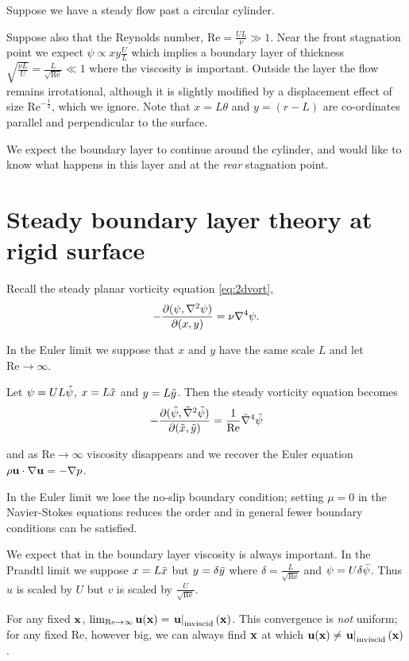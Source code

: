 \documentclass{notes}
\newcommand{\Rey}{\mathrm{Re}}
\theoremstyle{plain}
\begin{document}
Suppose we have a steady flow past a circular cylinder.

\vspace{1in}

Suppose also that the Reynolds number, $\Rey = \frac{U L}{\nu} \gg 1$.
Near the front stagnation point we expect $\psi \propto x y \frac{U}{L}$
which implies a boundary layer of thickness $\sqrt{\frac{\nu L}{U}}
= \frac{L}{\sqrt{\Rey}} \ll 1$ where the viscosity is important.  Outside
the layer the flow remains irrotational, although it is slightly
modified by a displacement effect of size $\Rey^{-\frac{1}{2}}$, which
we ignore.  Note that $x = L \theta$ and $y = (r - L)$ are co-ordinates 
parallel and perpendicular to the surface.

We expect the boundary layer to continue around the cylinder, and
would like to know what happens in this layer and at the \emph{rear}
stagnation point.

\section[Steady boundary layers]{Steady boundary layer theory at rigid surface}

Recall the steady planar vorticity equation \eqref{eq:2dvort},
\[
- \frac{\partial (\psi,\nabla^2 \psi)}{\partial (x,y)} = \nu \nabla^4 \psi.
\]

In the Euler limit we suppose that $x$ and $y$ have the same scale $L$
and let $\Rey \to \infty$.

Let $\psi = U L \Tilde{\psi}$, $x = L \Tilde{x}$ and $y = L \Tilde{y}$.
Then the steady vorticity equation becomes
\[
- \pd{(\Tilde{\psi},\Tilde{\nabla}^2 \Tilde \psi)}{(\Tilde{x},\Tilde{y})}
= \frac{1}{\Rey} \Tilde{\nabla}^4 \Tilde{\psi}
\]

and as $\Rey \to \infty$ viscosity disappears and we recover the Euler
equation $\rho \mathbf{u} \cdot \nabla \mathbf{u} = - \nabla p$.

In the Euler limit we lose the no-slip boundary condition; setting
$\mu = 0$ in the Navier-Stokes equations reduces the order and in general
fewer boundary conditions can be satisfied.

We expect that in the boundary layer viscosity is always important.
In the Prandtl limit we suppose $x = L \Bar{x}$ but $y = \delta \Bar{y}$
where $\delta = \frac{L}{\sqrt{\Rey}}$ and $\psi = U \delta \Bar{\psi}$.
Thus $u$ is scaled by $U$ but $v$ is scaled by $\frac{U}{\sqrt{\Rey}}$.

For any fixed $\mathbf{x}$, $\lim_{\Rey \to \infty} \vu(\vx) = \left.\vu
\right|_{\text{inviscid}}(\vx)$.  This convergence is \emph{not} uniform;
for any fixed $\Rey$, however big, we can always find $\mathbf{x}$
at which $\mathbf{u}(\mathbf{x}) \neq \left.\mathbf{u} \right|_{\text{inviscid}}(\mathbf{x})$.
\end{document}
